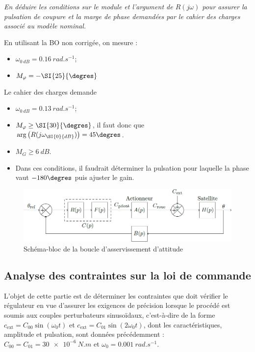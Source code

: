 \question{\label{q_17}}\textit{En déduire les conditions sur le module et l’argument de $R(j\omega)$ pour assurer la pulsation de coupure et
la marge de phase demandées par le cahier des charges associé au modèle nominal.}
\ifprof
\begin{corrige}
En utilisant la BO non corrigée, on mesure :
\begin{itemize}
\item $\omega_{\SI{0}{dB}} = \SI{0,16}{rad.s^{-1}}$;
\item $M_{\varphi}=-\SI{25}{\degres}$
\end{itemize}
Le cahier des charges demande 
\begin{itemize}
\item $\omega_{\SI{0}{dB}} = \SI{0,13}{rad.s^{-1}}$;
\item $M_{\varphi}\geq \SI{30}{\degres}$, il faut donc que $\arg\left(R(j\omega_{\SI{0}{dB}}) \right)=45\degres$.
\item $M_{G}\geq \SI{6}{dB}$.
\item Dans ces conditions, il faudrait déterminer la pulsation pour laquelle la phase vaut $-180\degres$ puis ajuster le gain.
\end{itemize}
\end{corrige}
\else
\fi


\ifprof
\else

\begin{figure}[H]
\centering
\includegraphics[width=.8\linewidth]{images/fig_11}
\caption{Schéma-bloc de la boucle d’asservissement d’attitude \label{fig_11}}
\end{figure}

\fi




\subsection{\label{sec:3:B} Analyse des contraintes sur la loi de commande}

\ifprof
\else

L’objet de cette partie est de déterminer les contraintes que doit vérifier le régulateur en vue d’assurer les
exigences de précision lorsque le procédé est soumis aux couples perturbateurs sinusoïdaux, c’est-à-dire de la
forme 
$c_{\text{ext}} = C_{00}\sin(\omega_0 t)$ et 
$c_{\text{ext}} = C_{01} \sin(2\omega_0t)$, 
dont les caractéristiques, amplitude et pulsation, sont données
précédemment : $C_{00} = C_{01} = \SI{30e-6}{N.m}$  et $\omega_0 = \SI{0,001}{rad.s^{-1}}$.
\fi


